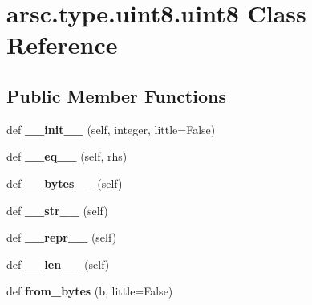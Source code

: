 \hypertarget{classarsc_1_1type_1_1uint8_1_1uint8}{}\section{arsc.\+type.\+uint8.\+uint8 Class Reference}
\label{classarsc_1_1type_1_1uint8_1_1uint8}
\subsection*{Public Member Functions}
\begin{DoxyCompactItemize}
\item 
\mbox{\label{classarsc_1_1type_1_1uint8_1_1uint8_ab2221de53e7e117a6284bc1ec030f474}} 
def {\bfseries \+\_\+\+\_\+init\+\_\+\+\_\+} (self, integer, little=False)
\item 
\mbox{\label{classarsc_1_1type_1_1uint8_1_1uint8_ab133acc312dbeb1bc02f0877d9eaf6eb}} 
def {\bfseries \+\_\+\+\_\+eq\+\_\+\+\_\+} (self, rhs)
\item 
\mbox{\label{classarsc_1_1type_1_1uint8_1_1uint8_a3c2eea28173df6c76e955106db52ee33}} 
def {\bfseries \+\_\+\+\_\+bytes\+\_\+\+\_\+} (self)
\item 
\mbox{\label{classarsc_1_1type_1_1uint8_1_1uint8_a5516ccc17d5a6499e5535e60936cc3f7}} 
def {\bfseries \+\_\+\+\_\+str\+\_\+\+\_\+} (self)
\item 
\mbox{\label{classarsc_1_1type_1_1uint8_1_1uint8_af14657677797e41b7f6ebf50542f0f0e}} 
def {\bfseries \+\_\+\+\_\+repr\+\_\+\+\_\+} (self)
\item 
\mbox{\label{classarsc_1_1type_1_1uint8_1_1uint8_a47e56b32c276775a3526b6f7c6f18576}} 
def {\bfseries \+\_\+\+\_\+len\+\_\+\+\_\+} (self)
\item 
\mbox{\label{classarsc_1_1type_1_1uint8_1_1uint8_af5e6ea08c4029b96edf105907c4ca1a8}} 
def {\bfseries from\+\_\+bytes} (b, little=False)
\end{DoxyCompactItemize}
